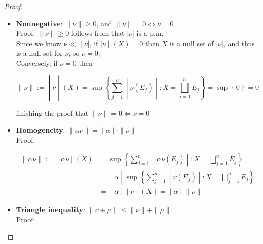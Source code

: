 \begin{proof}
\begin{itemize}
\item
  \textbf{Nonnegative}: \(\parallel \nu \parallel \geq 0\), and \(\parallel \nu \parallel = 0\Leftrightarrow\nu = 0\)\\
  Proof: \(\parallel \nu \parallel \geq 0\) follows from that \(|\nu|\) is a p.m.\\
  Since we know \(\left. \nu \ll \middle| \nu| \right.\), if \(\left. |\nu \middle| (X) = 0 \right.\) then \(X\) is a null set of \(|\nu|\), and thus is a null set for \(\nu\), so \(\nu = 0\);\\
  Conversely, if \(\nu = 0\) then

  \[\left. \parallel \nu \parallel := \middle| \nu \middle| (X) = \sup\left\{ \sum\limits_{j = 1}^{n} \middle| \nu(E_{j}) \middle| :X = \bigsqcup\limits_{j = 1}^{n}E_{j} \right\} = \sup\left\{ 0 \right\} = 0 \right.\]

  finishing the proof that \(\parallel \nu \parallel = 0\Leftrightarrow\nu = 0\)
\item
  \textbf{Homogeneity}: \(\left. \parallel \alpha\nu \parallel = \middle| \alpha \middle| \cdot \parallel \nu \parallel \right.\)\\
  Proof:

  \[\begin{matrix}
  \left. \parallel \alpha\nu \parallel := \middle| \alpha\nu \middle| (X) \right. & {= \sup\left\{ \sum\limits_{j = 1}^{n} \middle| \alpha\nu(E_{j}) \middle| :X = \bigsqcup\limits_{j = 1}^{n}E_{j} \right\}} \\
   & \left. = \middle| \alpha \middle| \sup\left\{ \sum\limits_{j = 1}^{n} \middle| \nu(E_{j}) \middle| :X = \bigsqcup\limits_{j = 1}^{n}E_{j} \right\} \right. \\
   & \left. = \middle| \alpha \middle| \middle| \nu \middle| (X) = \middle| \alpha \middle| \parallel \nu \parallel \right.
  \end{matrix}\]
\item
  \textbf{Triangle inequality}: \(\parallel \nu + \mu \parallel \leq \parallel \nu \parallel + \parallel \mu \parallel\)\\
  Proof:


\end{itemize}
\end{proof}
